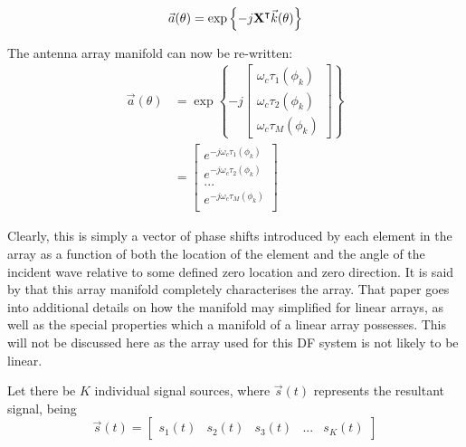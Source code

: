 \begin{equation}
  \vec{a}(\theta) = \exp \left\{ -j \mathbf{X}^\intercal \vec{k}(\theta) \right\}
\end{equation}



The antenna array manifold can now be re-written:
\begin{align}
\vec{a}(\theta) &= 
  \exp \left\{ -j \begin{bmatrix} 
      \omega_c \tau_1(\phi_k)\\ 
      \omega_c \tau_2(\phi_k)\\ 
      \omega_c \tau_M(\phi_k) 
   \end{bmatrix} \right\} \\
  &= \begin{bmatrix}
      e^{-j\omega_c \tau_1(\phi_k)} \\
      e^{-j\omega_c \tau_2(\phi_k)} \\
      ... \\
      e^{-j\omega_c \tau_M(\phi_k)} \\
   \end{bmatrix}
\end{align}

Clearly, this is simply a vector of phase shifts introduced by each element in the array as a function of both the location of the element and the angle of the incident wave relative to some defined zero location and zero direction. It is said by \cite{dacos1995estimating} that this array manifold completely characterises the array. That paper goes into additional details on how the manifold may simplified for linear arrays, as well as the special properties which a manifold of a linear array possesses. This will not be discussed here as the array used for this DF system is not likely to be linear. 

Let there be $K$ individual signal sources, where $\vec{s}(t)$ represents the resultant signal, being
\begin{equation}
\vec{s}(t) = \begin{bmatrix} s_{1}(t) & s_{2}(t) & s_3(t) & ... & s_K(t) \end{bmatrix}
\end{equation}
